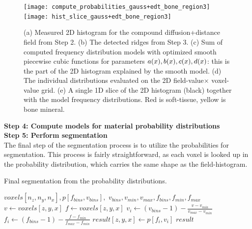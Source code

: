 \begin{figure}
  \centering
  \texttt{[image: compute\_probabilities\_gauss+edt\_bone\_region3]}\\
  \texttt{[image: hist\_slice\_gauss+edt\_bone\_region3]}\\
  \caption{(a) Measured 2D histogram for the compound diffusion+distance field from Step 2. (b)
    The detected ridges from Step 3. (c) Sum of computed frequency distribution models
    with optimized smooth piecewise cubic functions for parameters $a(x), b(x), c(x), d(x)$:
    this is the part of the 2D histogram explained by the smooth model. (d) The individual distributions evaluated
    on the 2D field-value$\times$ voxel-value grid. (e) A single 1D slice of the 2D histogram (black) together with
    the model frequency distributions. Red is soft-tissue, yellow is bone mineral.
  }
  \label{fig:curves-and-more}
\end{figure}

\vspace{\baselineskip}
\noindent\textbf{Step 4: Compute models for material probability distributions} \\


\vspace{\baselineskip}
\noindent\textbf{Step 5: Perform segmentation} \\
The final step of the segmentation process is to utilize the probabilities for segmentation.
This process is fairly straightforward, as each voxel is looked up in the probability distribution,
which carries the same shape as the field-histogram.

\begin{algorithm}
    \caption{Final segmentation from the probability distributions.}
    \label{alg:segment}
    \begin{algorithmic}
         {$voxels[n_z,n_y,n_x], p[f_{bins},v_{bins}],$ \newline \indent \indent $v_{bins}, v_{min}, v_{max}, f_{bins}, f_{min}, f_{max}$}
                \State $v \gets voxels[z,y,x]$
                    \State $f \gets voxels[z,y,x]$
                        \State $v_i \gets (v_{bins} - 1) - \frac{v - v_{min}}{v_{max} - v_{min}}$
                        \State $f_i \gets (f_{bins} - 1) - \frac{f - f_{min}}{f_{max} - f_{min}}$
                        \State $result[z,y,x] \gets p[f_i, v_i]$
                    \EndIf
                \EndIf
            \EndFor
            \Return $result$
        \EndFunction
    \end{algorithmic}
\end{algorithm}

